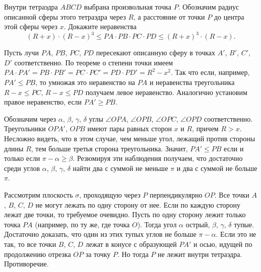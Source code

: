\problem
Внутри тетраэдра $ABCD$ выбрана произвольная точка $P$.
Обозначим радиус описанной сферы этого тетраэдра через $R$, а расстояние от
точки $P$ до центра этой сферы через $x$.
Докажите неравенства
\[
    (R + x) \cdot (R - x)^3
\leq
    PA \cdot PB \cdot PC \cdot PD
\leq
    (R + x)^3 \cdot (R - x)
.\]

\solution
Пусть лучи $PA$, $PB$, $PC$, $PD$ пересекают описанную сферу в точках
$A'$, $B'$, $C'$, $D'$ соответственно.
По теореме о степени точки имеем
$PA \cdot PA' = PB \cdot PB' = PC \cdot PC' = PD \cdot PD' = R^2 - x^2$.
Так что если, например, $PA' \leq PB$, то умножая это неравенство на $PA$ и
неравенства треугольника $R - x \leq PC$, $R - x \leq PD$ получаем левое
неравенство.
Аналогично установим правое неравенство, если $PA' \geq PB$.
\par
Обозначим через $\alpha$, $\beta$, $\gamma$, $\delta$ углы
$\angle OPA$, $\angle OPB$, $\angle OPC$, $\angle OPD$ соответственно.
Треугольники $OPA'$, $OPB$ имеют пары равных сторон $x$ и $R$, причем $R > x$.
Несложно видеть, что в этом случае, чем меньше угол, лежащий против стороны
длины $R$, тем больше третья сторона треугольника.
Значит, $PA' \leq PB$ если и только если $\pi - \alpha \geq \beta$.
Резюмируя эти наблюдения получаем, что достаточно среди углов
$\alpha$, $\beta$, $\gamma$, $\delta$ найти два с суммой не меньше $\pi$ и
два с суммой не больше $\pi$.
\par
Рассмотрим плоскость $\sigma$, проходящую через $P$ перпендикулярно $OP$.
Все точки $A$, $B$, $C$, $D$ не могут лежать по одну сторону от нее.
Если по каждую сторону лежат две точки, то требуемое очевидно.
Пусть по одну сторону лежит только точка $PA$
(например, по ту же, где точка $O$).
Тогда угол  $\alpha$ острый, $\beta$, $\gamma$, $\delta$ тупые.
Достаточно доказать, что один из этих тупых углов не больше $\pi - \alpha$.
Если это не так, то все точки $B$, $C$, $D$ лежат в конусе с образующей $PA'$ и осью, идущей по продолжению отрезка $OP$ за точку $P$.
Но тогда $P$ не лежит внутри тетраэдра.
Противоречие.

\endproblem
